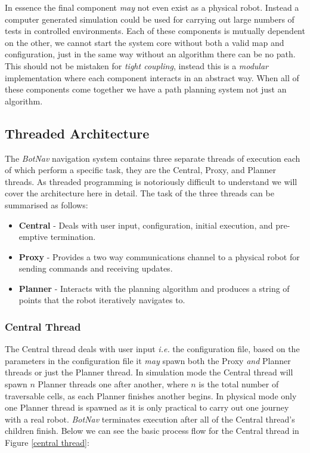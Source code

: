 \noindent
In essence the final component \textit{may} not even exist as a physical robot. Instead a computer generated simulation could be used for carrying out large numbers of tests in controlled environments. Each of these components is mutually dependent on the other, we cannot start the system core without both a valid map and configuration, just in the same way without an algorithm there can be no path. This should not be mistaken for \textit{tight coupling}, instead this is a \textit{modular} implementation where each component interacts in an abstract way. When all of these components come together we have a path planning system not just an algorithm.

\subsection{Threaded Architecture}

\noindent
The \textit{BotNav} navigation system contains three separate threads of execution each of which perform a specific task, they are the Central, Proxy, and Planner threads. As threaded programming is notoriously difficult to understand we will cover the architecture here in detail. The task of the three threads can be summarised as follows: 

\begin{itemize}
\item \textbf{Central} - Deals with user input, configuration, initial execution, and pre-emptive termination. 
\item \textbf{Proxy} - Provides a two way communications channel to a physical robot for sending commands and receiving updates.
\item \textbf{Planner} - Interacts with the planning algorithm and produces a string of points that the robot iteratively navigates to.
\end{itemize} 

\subsubsection*{Central Thread}
\noindent
The Central thread deals with user input \textit{i.e.} the configuration file, based on the parameters in the configuration file it \textit{may} spawn both the Proxy \textit{and} Planner threads or just the Planner thread. In simulation mode the Central thread will spawn $n$ Planner threads one after another, where $n$ is the total number of traversable cells, as each Planner finishes another begins. In physical mode only one Planner thread is spawned as it is only practical to carry out one journey with a real robot. \textit{BotNav} terminates execution after all of the Central thread's children finish. Below we can see the basic process flow for the Central thread in Figure \ref{central thread}:

